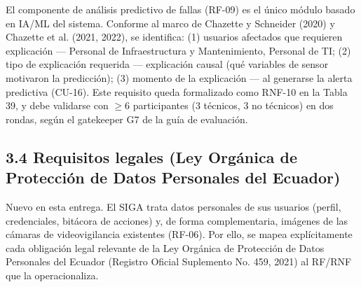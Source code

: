 
El componente de análisis predictivo de fallas (RF-09) es el único módulo basado en IA/ML del sistema. Conforme al marco de Chazette y Schneider (2020) y Chazette et al. (2021, 2022), se identifica: (1) usuarios afectados que requieren explicación --- Personal de Infraestructura y Mantenimiento, Personal de TI; (2) tipo de explicación requerida --- explicación causal (qué variables de sensor motivaron la predicción); (3) momento de la explicación --- al generarse la alerta predictiva (CU-16). Este requisito queda formalizado como RNF-10 en la Tabla 39, y debe validarse con $\geq$6 participantes (3 técnicos, 3 no técnicos) en dos rondas, según el gatekeeper G7 de la guía de evaluación.


\subsection*{3.4 Requisitos legales (Ley Orgánica de Protección de Datos Personales del Ecuador)}


Nuevo en esta entrega. El SIGA trata datos personales de sus usuarios (perfil, credenciales, bitácora de acciones) y, de forma complementaria, imágenes de las cámaras de videovigilancia existentes (RF-06). Por ello, se mapea explícitamente cada obligación legal relevante de la Ley Orgánica de Protección de Datos Personales del Ecuador (Registro Oficial Suplemento No. 459, 2021) al RF/RNF que la operacionaliza.


